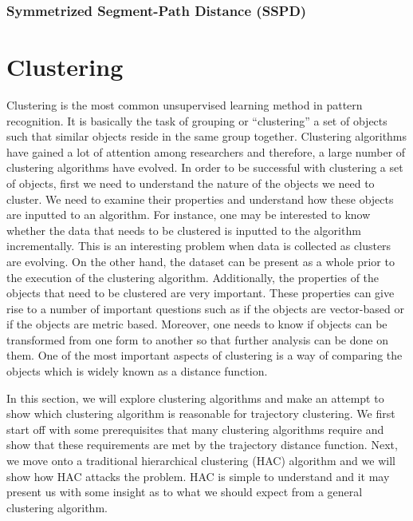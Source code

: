 \documentclass[a4paper, 12pt]{article}
\begin{document}
\subsubsection{Symmetrized Segment-Path Distance (SSPD)}

\section{Clustering}
Clustering is the most common unsupervised learning method in pattern recognition. It is basically the task of grouping or “clustering” a set of objects such that similar objects reside in the same group together. Clustering algorithms have gained a lot of attention among researchers and therefore, a large number of clustering algorithms have evolved. In order to be successful with clustering a set of objects, first we need to understand the nature of the objects we need to cluster. We need to examine their properties and understand how these objects are inputted to an algorithm. For instance, one may be interested to know whether the data that needs to be clustered is inputted to the algorithm incrementally. This is an interesting problem when data is collected as clusters are evolving. On the other hand, the dataset can be present as a whole prior to the execution of the clustering algorithm. Additionally, the properties of the objects that need to be clustered are very important. These properties can give rise to a number of important questions such as if the objects are vector-based or if the objects are metric based. Moreover, one needs to know if objects can be transformed from one form to another so that further analysis can be done on them. One of the most important aspects of clustering is a way of comparing the objects which is widely known as a distance function. 

In this section, we will explore clustering algorithms and make an attempt to show which clustering algorithm is reasonable for trajectory clustering. We first start off with some prerequisites that many clustering algorithms require and show that these requirements are met by the trajectory distance function. Next, we move onto a traditional hierarchical clustering (HAC) algorithm and we will show how HAC attacks the problem. HAC is simple to understand and it may present us with some insight as to what we should expect from a general clustering algorithm.
\end{document}
